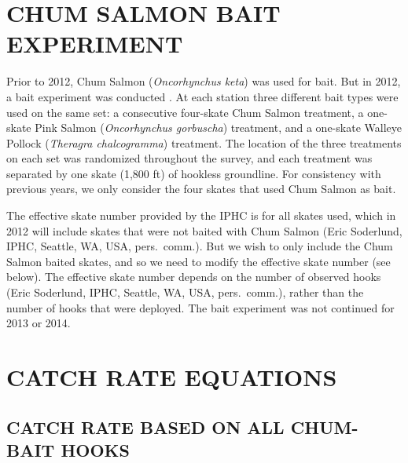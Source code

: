 
\section{CHUM SALMON BAIT EXPERIMENT}\label{sec:chum}

Prior to 2012, Chum Salmon (\emph{Oncorhynchus keta}) was used for bait. But in
2012, a bait experiment was conducted \citep{hsdgr13}. At each station three
different bait types were used on the same set: a consecutive four-skate Chum
Salmon treatment, a one-skate Pink Salmon (\emph{Oncorhynchus gorbuscha})
treatment, and a one-skate Walleye Pollock (\emph{Theragra chalcogramma})
treatment. The location of the three treatments on each set was randomized
throughout the survey, and each treatment was separated by one skate (1,800 ft)
of hookless groundline. For consistency with previous years, we only consider
the four skates that used Chum Salmon as bait.

The effective skate number provided by the IPHC is for all skates used, which in
2012 will include skates that were not baited with Chum Salmon (Eric Soderlund,
IPHC, Seattle, WA, USA, pers.~comm.). But we wish to only include the Chum
Salmon baited skates, and so we need to modify the effective skate number (see
below). The effective skate number depends on the number of observed hooks (Eric
Soderlund, IPHC, Seattle, WA, USA, pers.~comm.), rather than the number of hooks
that were deployed. The bait experiment was not continued for 2013 or 2014.


\section{CATCH RATE EQUATIONS}\label{sec:notation}

\subsection{CATCH RATE BASED ON ALL CHUM-BAIT HOOKS}

